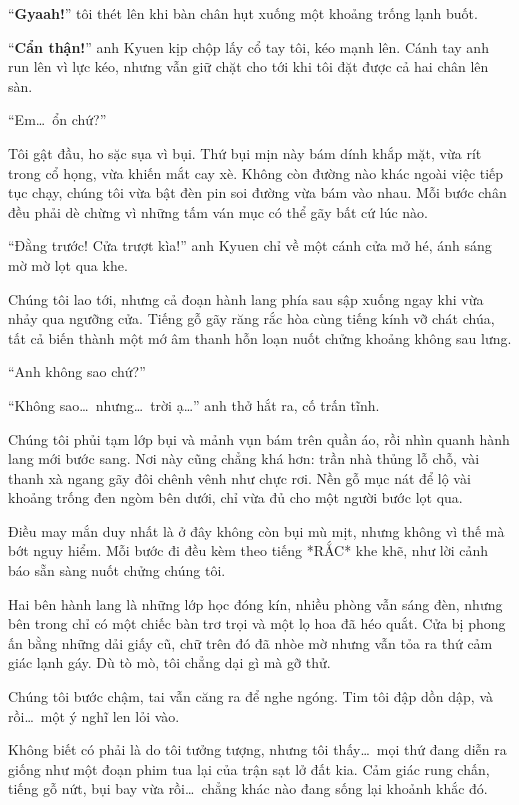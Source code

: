 \documentclass[../main.tex]{subfiles}
\begin{document}
``\textbf{Gyaah!}''  tôi thét lên khi bàn chân hụt xuống một khoảng trống lạnh buốt.

``\textbf{Cẩn thận!}'' anh Kyuen kịp chộp lấy cổ tay tôi, kéo mạnh lên. Cánh tay anh run lên vì lực kéo, nhưng vẫn giữ chặt cho tới khi tôi đặt được cả hai chân lên sàn.

``Em\dots\ ổn chứ?''

Tôi gật đầu, ho sặc sụa vì bụi. Thứ bụi mịn này bám dính khắp mặt, vừa rít trong cổ họng, vừa khiến mắt cay xè. Không còn đường nào khác ngoài việc tiếp tục chạy, chúng tôi vừa bật đèn pin soi đường vừa bám vào nhau. Mỗi bước chân đều phải dè chừng vì những tấm ván mục có thể gãy bất cứ lúc nào.

``Đằng trước! Cửa trượt kìa!'' anh Kyuen chỉ về một cánh cửa mở hé, ánh sáng mờ mờ lọt qua khe.

Chúng tôi lao tới, nhưng cả đoạn hành lang phía sau sập xuống ngay khi vừa nhảy qua ngưỡng cửa. Tiếng gỗ gãy răng rắc hòa cùng tiếng kính vỡ chát chúa, tất cả biến thành một mớ âm thanh hỗn loạn nuốt chửng khoảng không sau lưng.

``Anh không sao chứ?''

``Không sao\dots\ nhưng\dots\ trời ạ\dots'' anh thở hắt ra, cố trấn tĩnh.

Chúng tôi phủi tạm lớp bụi và mảnh vụn bám trên quần áo, rồi nhìn quanh hành lang mới bước sang. Nơi này cũng chẳng khá hơn: trần nhà thủng lỗ chỗ, vài thanh xà ngang gãy đôi chênh vênh như chực rơi. Nền gỗ mục nát để lộ vài khoảng trống đen ngòm bên dưới, chỉ vừa đủ cho một người bước lọt qua.


Điều may mắn duy nhất là ở đây không còn bụi mù mịt, nhưng không vì thế mà bớt nguy hiểm. Mỗi bước đi đều kèm theo tiếng *RẮC* khe khẽ, như lời cảnh báo sẵn sàng nuốt chửng chúng tôi.

Hai bên hành lang là những lớp học đóng kín, nhiều phòng vẫn sáng đèn, nhưng bên trong chỉ có một chiếc bàn trơ trọi và một lọ hoa đã héo quắt. Cửa bị phong ấn bằng những dải giấy cũ, chữ trên đó đã nhòe mờ nhưng vẫn tỏa ra thứ cảm giác lạnh gáy. Dù tò mò, tôi chẳng dại gì mà gỡ thử.


Chúng tôi bước chậm, tai vẫn căng ra để nghe ngóng. Tim tôi đập dồn dập, và rồi\dots\ một ý nghĩ len lỏi vào.

Không biết có phải là do tôi tưởng tượng, nhưng tôi thấy\dots\ mọi thứ đang diễn ra giống như một đoạn phim tua lại của trận sạt lở đất kia. Cảm giác rung chấn, tiếng gỗ nứt, bụi bay vừa rồi\dots\ chẳng khác nào đang sống lại khoảnh khắc đó.
\end{document}
